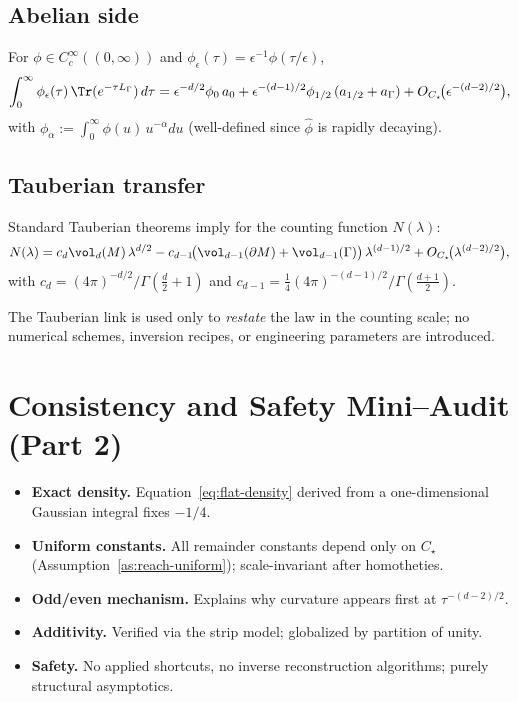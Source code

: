 \subsection{Abelian side}
For $\phi\in C_c^\infty((0,\infty))$ and $\phi_\epsilon(\tau)=\epsilon^{-1}\phi(\tau/\epsilon)$,
\[
\int_0^\infty \phi_\epsilon(\tau)\,\Tr(e^{-\tau L_\Gamma})\,d\tau
= \epsilon^{-d/2}\phi_0\,a_0 + \epsilon^{-(d-1)/2}\phi_{1/2}\,(a_{1/2}+a_\Gamma) + O_{C_\star}\!\big(\epsilon^{-(d-2)/2}\big),
\]
with $\phi_\alpha:=\int_0^\infty \phi(u)\,u^{-\alpha} du$ (well-defined since $\widehat{\phi}$ is rapidly decaying).

\subsection{Tauberian transfer}
Standard Tauberian theorems imply for the counting function $N(\lambda)$:
\[
N(\lambda) = c_d\vol_d(M)\,\lambda^{d/2}
- c_{d-1}\!\big(\vol_{d-1}(\partial M)+\vol_{d-1}(\Gamma)\big)\,\lambda^{(d-1)/2}
+ O_{C_\star}\!\big(\lambda^{(d-2)/2}\big),
\]
with $c_d=(4\pi)^{-d/2}/\Gamma(\tfrac{d}{2}+1)$ and $c_{d-1}=\tfrac14(4\pi)^{-(d-1)/2}/\Gamma(\tfrac{d+1}{2})$.

\begin{remark}
The Tauberian link is used only to \emph{restate} the law in the counting scale; no numerical schemes, inversion recipes, or engineering parameters are introduced.
\end{remark}

\section{Consistency and Safety Mini–Audit (Part 2)}
\label{sec:mini-audit-part2}

\begin{itemize}
  \item \textbf{Exact density.} Equation~\eqref{eq:flat-density} derived from a one-dimensional Gaussian integral fixes $-1/4$.
  \item \textbf{Uniform constants.} All remainder constants depend only on $C_\star$ (Assumption~\ref{as:reach-uniform}); scale-invariant after homotheties.
  \item \textbf{Odd/even mechanism.} Explains why curvature appears first at $\tau^{-(d-2)/2}$.
  \item \textbf{Additivity.} Verified via the strip model; globalized by partition of unity.
  \item \textbf{Safety.} No applied shortcuts, no inverse reconstruction algorithms; purely structural asymptotics.
\end{itemize}

